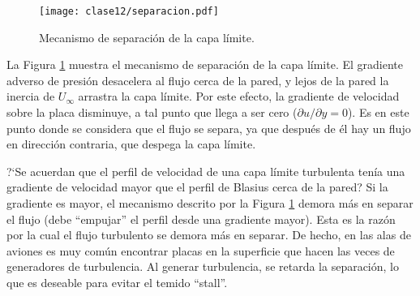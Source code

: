 \begin{figure}
\centering
\texttt{[image: clase12/separacion.pdf]}
\caption{Mecanismo de separación de la capa límite.}
\label{fig:separacion}
\end{figure}

La Figura \ref{fig:separacion} muestra el mecanismo de separación de la capa límite.
El gradiente adverso de presión desacelera al flujo cerca de la pared, y lejos de la pared la inercia de $U_\infty$ arrastra la capa límite.
Por este efecto, la gradiente de velocidad sobre la placa disminuye, a tal punto que llega a ser cero ($\partial u/\partial y=0$).
Es en este punto donde se considera que el flujo se separa, ya que después de él hay un flujo en dirección contraria, que despega la capa límite.

\mbox{?`}Se acuerdan que el perfil de velocidad de una capa límite turbulenta tenía una gradiente de velocidad mayor que el perfil de Blasius cerca de la pared?
Si la gradiente es mayor, el mecanismo descrito por la Figura \ref{fig:separacion} demora más en separar el flujo (debe ``empujar'' el perfil desde una gradiente mayor).
Esta es la razón por la cual el flujo turbulento se demora más en separar.
De hecho, en las alas de aviones es muy común encontrar placas en la superficie que hacen las veces de generadores de turbulencia.
Al generar turbulencia, se retarda la separación, lo que es deseable para evitar el temido ``stall''.
